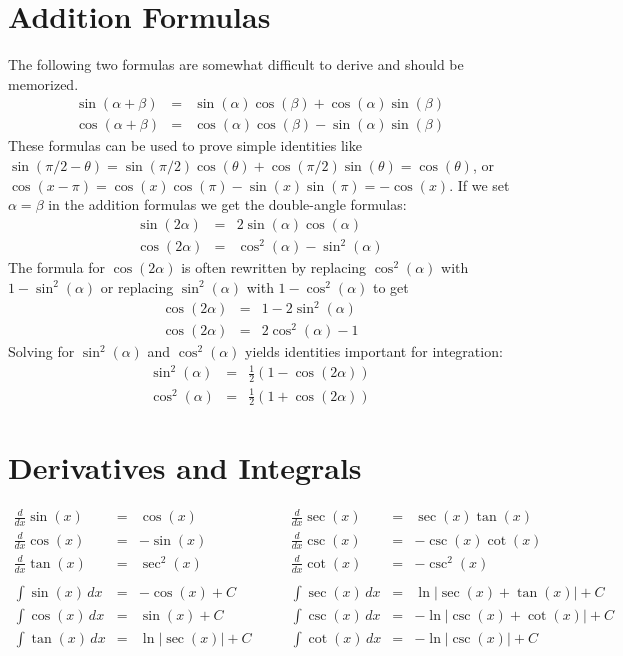 \documentclass{article}
\begin{document}
\section*{Addition Formulas}
The following two formulas are somewhat difficult to derive and should
be memorized.
\begin{eqnarray*}
\sin(\alpha+\beta) &=& \sin(\alpha)\cos(\beta) + \cos(\alpha)\sin(\beta) \\
\cos(\alpha+\beta) &=& \cos(\alpha)\cos(\beta) - \sin(\alpha)\sin(\beta)
\end{eqnarray*}
These formulas can be used to prove simple identities like
$\sin(\pi/2 - \theta) = \sin(\pi/2)\cos(\theta) + \cos(\pi/2)\sin(\theta) =
\cos(\theta)$, or $\cos(x-\pi) = \cos(x)\cos(\pi) - \sin(x)\sin(\pi) =
-\cos(x)$.  If we set $\alpha = \beta$ in the addition formulas we get the 
double-angle formulas:
\begin{eqnarray*}
\sin(2\alpha) &=&  2\sin(\alpha)\cos(\alpha) \\
\cos(2\alpha) &=& \cos^2(\alpha) - \sin^2(\alpha)
\end{eqnarray*}
The formula for $\cos(2\alpha)$ is often rewritten by replacing
$\cos^2(\alpha)$ with $1-\sin^2(\alpha)$ or replacing $\sin^2(\alpha)$
with $1-\cos^2(\alpha)$ to get
\begin{eqnarray*}
\cos(2\alpha) &=& 1 - 2\sin^2(\alpha) \\
\cos(2\alpha) &=& 2\cos^2(\alpha) - 1
\end{eqnarray*}
Solving for $\sin^2(\alpha)$ and $\cos^2(\alpha)$ yields identities
important for integration:
\begin{eqnarray*}
\sin^2(\alpha) &=& \frac{1}{2}(1 - \cos(2\alpha)) \\
\cos^2(\alpha) &=& \frac{1}{2}(1 + \cos(2\alpha))
\end{eqnarray*}

\section*{Derivatives and Integrals}
\[
\begin{array}{rclrcl}
\frac{d}{dx}\sin(x) &=& \cos(x)\quad &\quad
\frac{d}{dx}\sec(x) &=& \sec(x)\tan(x)\\
\frac{d}{dx}\cos(x) &=& -\sin(x)\quad &\quad
\frac{d}{dx}\csc(x) &=& -\csc(x)\cot(x) \\
\frac{d}{dx}\tan(x) &=& \sec^2(x)\quad &\quad
\frac{d}{dx}\cot(x) &=& -\csc^2(x) \\
\\
\int\sin(x)\,dx &=& -\cos(x)+C\quad &\quad
\int\sec(x)\,dx &=& \ln|\sec(x)+\tan(x)|+C\\
\int\cos(x)\,dx &=& \sin(x)+C\quad &\quad
\int\csc(x)\,dx &=& -\ln|\csc(x)+\cot(x)|+C \\
\int\tan(x)\,dx &=& \ln|\sec(x)|+C\quad &\quad 
\int\cot(x)\,dx &=& -\ln|\csc(x)|+C
\end{array}
\]
\end{document}
